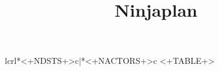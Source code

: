 \documentclass{ucph-revy}
\title{Ninjaplan}
\begin{document}
\maketitle

\centering

\begin{longtable}{lcrl*{<+NDSTS+>}{c}|*{<+NACTORS+>}{c}}
<+TABLE+>
\end{longtable}
  
\end{document}
